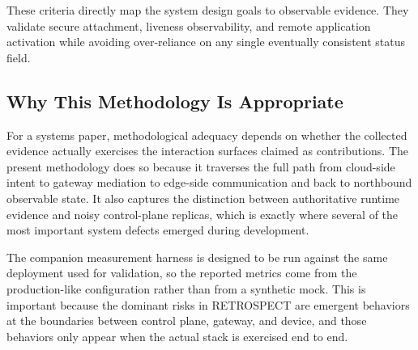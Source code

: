 These criteria directly map the system design goals to observable evidence. They validate secure attachment, liveness observability, and remote application activation while avoiding over-reliance on any single eventually consistent status field.

\subsection{Why This Methodology Is Appropriate}
For a systems paper, methodological adequacy depends on whether the collected evidence actually exercises the interaction surfaces claimed as contributions. The present methodology does so because it traverses the full path from cloud-side intent to gateway mediation to edge-side communication and back to northbound observable state. It also captures the distinction between authoritative runtime evidence and noisy control-plane replicas, which is exactly where several of the most important system defects emerged during development.

The companion measurement harness is designed to be run against the same deployment used for validation, so the reported metrics come from the production-like configuration rather than from a synthetic mock. This is important because the dominant risks in RETROSPECT are emergent behaviors at the boundaries between control plane, gateway, and device, and those behaviors only appear when the actual stack is exercised end to end.
